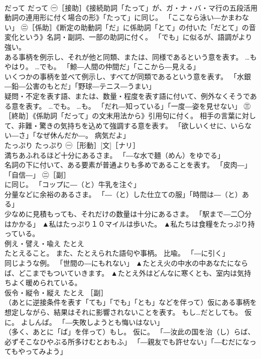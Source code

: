 \documentclass[8pt]{extreport}
\begin{document}
\begin{CJK}{UTF8}{min}
\\	だって	だって	㊀［接助］《接続助詞「たって」が、ガ・ナ・バ・マ行の五段活用動詞の連用形に付く場合の形》「たって」に同じ。 「ここなら泳い―かまわない」 ㊁［係助］《断定の助動詞「だ」に係助詞「とて」の付いた「だとて」の音変化という》名詞・副詞、一部の助詞に付く。 「でも」に似るが、語調がより強い。 
\\	ある事柄を例示し、それが他と同類、または、同様であるという意を表す。 …もやはり。 …でも。 「鯨―人間の仲間だ」「ここから―見える」 
\\	いくつかの事柄を並べて例示し、すべてが同類であるという意を表す。 「水銀―鉛―公害のもとだ」「野球―テニス―うまい」 
\\	疑問・不定を表す語、または、数量・程度を表す語に付いて、例外なくそうである意を表す。 …でも。 …も。 「だれ―知っている」「一度―姿を見せない」 ㊂［終助］《係助詞「だって」の文末用法から》引用句に付く。 相手の言葉に対して、非難・驚きの気持ちを込めて強調する意を表す。 「欲しいくせに、いらない―さ」「なぜ休んだか―。 病気だよ」	
\\	たっぷり	たっぷり	㊀［形動］[文]［ナリ］ 
\\	満ちあふれるほど十分にあるさま。 「―な水で麺（めん）をゆでる」 
\\	名詞の下に付いて、ある要素が普通よりも多めであることを表す。 「皮肉―」「自信―」 ㊁［副］ 
\\	に同じ。 「コップに―（と）牛乳を注ぐ」 
\\	分量などに余裕のあるさま。 「―（と）した仕立ての服」「時間は―（と）ある」 
\\	少なめに見積もっても、それだけの数量は十分にあるさま。 「駅まで―二〇分はかかる」	▲私はたっぷり１０マイルは歩いた。 ▲私たちは食糧をたっぷり持っている。
\\	例え・譬え・喩え	たとえ	
\\	たとえること。 また、たとえられた語句や事柄。 比喩。 「―に引く」 
\\	同じような例。 「世間の―にもれない」	▲たとえ火の中水の中あなたにならば、どこまでもついていきます。 ▲たとえ外はどんなに寒くとも、室内は気持ちよく暖められている。
\\	仮令・縦令・縦え	たとえ	［副］ 
\\	（あとに逆接条件を表す「ても」「でも」「とも」などを伴って）仮にある事柄を想定しながら、結果はそれに影響されないことを表す。 もし…だとしても。 仮に。 よしんば。 「―失敗しようとも悔いはない」 
\\	（多く、あとに「ば」を伴って）もし。 仮に。 「―汝此の国を治（し）らば、必ずそこなひやぶる所多けむとおもふ」 「―親友でも許せない」「―むだになってもやってみよう」	

\end{CJK}
\end{document}
